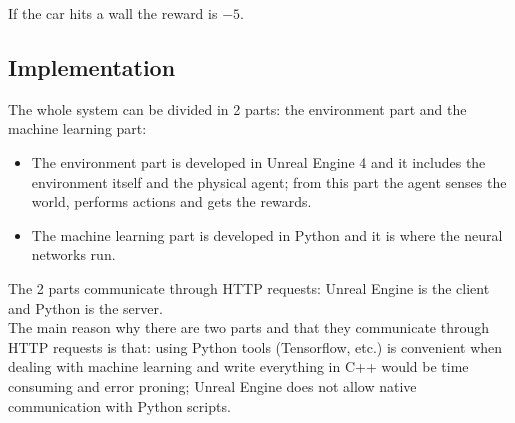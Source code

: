 \documentclass[14pt]{extarticle}
\def\sp{\vspace{5pt}}
\begin{document}
\begin{flushleft}
	If the car hits a wall the reward is $-5$.
	
\subsection{Implementation}
\sp
The whole system can be divided in 2 parts: the environment part and the machine learning part:
\begin{itemize}
\item The environment part is developed in Unreal Engine 4 and it includes the environment itself and the physical agent; from this part the agent senses the world, performs actions and gets the rewards.
\item The machine learning part is developed in Python and it is where the neural networks run.
\end{itemize}
The 2 parts communicate through HTTP requests: Unreal Engine is the client and Python is the server. 
\\
The main reason why there are two parts and that they communicate through HTTP requests is that: using Python tools (Tensorflow, etc.) is convenient when dealing with machine learning and write everything in C++ would be time consuming and error proning; Unreal Engine does not allow native communication with Python scripts.

\end{flushleft}
\end{document}
